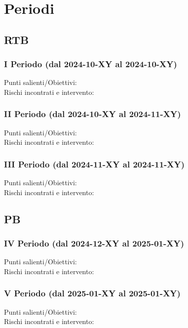 \section{Periodi}
    \subsection{RTB}
        \subsubsection{I Periodo (dal 2024-10-XY al 2024-10-XY)}
        Punti salienti/Obiettivi: \\
        Rischi incontrati e intervento:
        \subsubsection{II Periodo (dal 2024-10-XY al 2024-11-XY)}
        Punti salienti/Obiettivi: \\
        Rischi incontrati e intervento:
        \subsubsection{III Periodo (dal 2024-11-XY al 2024-11-XY)}
        Punti salienti/Obiettivi: \\
        Rischi incontrati e intervento:
    \subsection{PB}
        \subsubsection{IV Periodo (dal 2024-12-XY al 2025-01-XY)}
        Punti salienti/Obiettivi: \\
        Rischi incontrati e intervento:
        \subsubsection{V Periodo (dal 2025-01-XY al 2025-01-XY)}
        Punti salienti/Obiettivi: \\
        Rischi incontrati e intervento:
